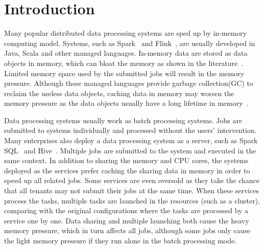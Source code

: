 \section{Introduction}

Many popular distributed data processing systems are sped up by in-memory computing model. Systems, such as Spark~\cite{zaharia2012resilient} and Flink~\cite{hueske2012opening}, are usually developed in Java, Scala and other managed languages. In-memory data are stored as data objects in memory, which can bloat the memory as shown in the literature~\cite{bu:bloat}. Limited memory space used by the submitted jobs will result in the memory pressure. Although these managed languages provide garbage collection(GC) to reclaim the useless data objects, caching data in memory may worsen the memory pressure as the data objects usually have a long lifetime in memory~\cite{lulu:deca}. 

Data processing systems usually work as batch processing systems. Jobs are submitted to systems individually and processed without the users' intervention. Many enterprises also deploy a data processing system as a server, such as Spark SQL~\cite{armbrust2015spark} and Hive~\cite{ashish:hive}. Multiple jobs are submitted to the system and executed in the same context. In addition to sharing the memory and CPU cores, the systems deployed as the services prefer caching the sharing data in memory in order to speed up all related jobs.
Some services are even oversold as they take the chance that all tenants may not submit their jobs at the same time. When these services process the tasks, multiple tasks are launched in the resources (such as a cluster), comparing with the original configurations where the tasks are processed by a service one by one. Data sharing and multiple launching both cause the heavy memory pressure, which in turn affects all jobs, although some jobs only cause the light memory pressure if they run alone in the batch processing mode.


